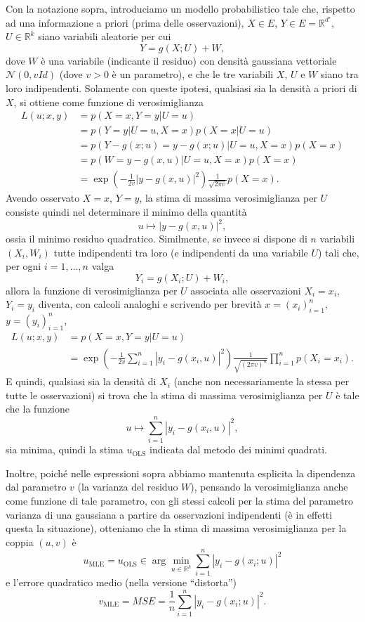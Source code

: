 \documentclass[
  italian,
  letterpaper,
]{book}
\newcommand{\bra}[1]{\left( #1 \right)}
\newcommand{\R}{\mathbb{R}}
\newcommand{\mle}{\operatorname{MLE}}
\newcommand{\ols}{\operatorname{OLS}}
\theoremstyle{definition}
\theoremstyle{remark}
\begin{document}
Con la notazione sopra, introduciamo un modello probabilistico tale che,
rispetto ad una informazione a priori (prima delle osservazioni),
\(X \in E\), \(Y \in E = \R^{d'}\), \(U \in \R^k\) siano variabili
aleatorie per cui \[ Y = g(X;U) + W,\] dove \(W\) è una variabile
(indicante il residuo) con densità gaussiana vettoriale
\(\mathcal{N}(0, v Id)\) (dove \(v>0\) è un parametro), e che le tre
variabili \(X\), \(U\) e \(W\) siano tra loro indipendenti. Solamente
con queste ipotesi, qualsiasi sia la densità a priori di \(X\), si
ottiene come funzione di verosimiglianza
\[ \begin{split} L(u ; x, y) & = p(X=x, Y=y |  U = u) \\
&= p(Y=y| U=u, X=x) p(X=x| U=u)\\
& = p( Y-g(x;u) = y-g(x;u) | U=u, X=x) p(X=x) \\
& = p( W = y-g(x,u) | U=u, X=x) p(X=x)\\
& =  \exp\bra{ -\frac 1 {2v} |y-g(x,u)|^2 }\frac{1}{\sqrt{ 2 \pi v}} p(X=x).
\end{split}\] Avendo osservato \(X=x\), \(Y=y\), la stima di massima
verosimiglianza per \(U\) consiste quindi nel determinare il minimo
della quantità \[  u \mapsto |y-g(x,u)|^2, \] ossia il minimo residuo
quadratico. Similmente, se invece si dispone di \(n\) variabili
\((X_i, W_i)\) tutte indipendenti tra loro (e indipendenti da una
variabile \(U\)) tali che, per ogni \(i=1, \ldots, n\) valga
\[ Y_i = g(X_i; U) + W_i,\] allora la funzione di verosimiglianza per
\(U\) associata alle osservazioni \(X_i=  x_i\), \(Y_i = y_i\) diventa,
con calcoli analoghi e scrivendo per brevità \(x = (x_i)_{i=1}^n\),
\(y= (y_i)_{i=1}^n\),
\[ \begin{split} L(u ; x, y) & = p(X=x, Y=y |  U = u) \\
& =  \exp\bra{ -\frac 1 {2 v} \sum_{i=1}^n |y_i-g(x_i,u)|^2 }\frac{1}{\sqrt{ (2 \pi v)^n}} \prod_{i=1}^n p(X_i=x_i).\end{split}\]
E quindi, qualsiasi sia la densità di \(X_i\) (anche non necessariamente
la stessa per tutte le osservazioni) si trova che la stima di massima
verosimiglianza per \(U\) è tale che la funzione
\[ u \mapsto \sum_{i=1}^n |y_i-g(x_i,u)|^2,\] sia minima, quindi la
stima \(u_{\ols}\) indicata dal metodo dei minimi quadrati.

Inoltre, poiché nelle espressioni sopra abbiamo mantenuta esplicita la
dipendenza dal parametro \(v\) (la varianza del residuo \(W\)), pensando
la verosimiglianza anche come funzione di tale parametro, con gli stessi
calcoli per la stima del parametro varianza di una gaussiana a partire
da osservazioni indipendenti (è in effetti questa la situazione),
otteniamo che la stima di massima verosimiglianza per la coppia
\((u, v)\) è
\[ u_{\mle } = u _{\ols} \in  \arg \min_{u \in \R^k} \sum_{i=1}^n |y_i-g(x_i;u)|^2\]
e l'errore quadratico medio (nella versione ``distorta'')
\[ v_{\mle} = MSE = \frac 1 n \sum_{i=1}^n |y_i-g(x_i;u)|^2.\]
\end{document}
